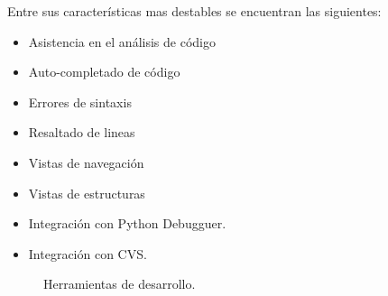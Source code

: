 \documentclass[12pt]{book} %
\begin{document}
		Entre sus características mas destables se encuentran las siguientes:
		\begin{multicols}{2}
		\begin{itemize}
			\item Asistencia en el análisis de código
			\item Auto-completado de código
			\item Errores de sintaxis
			\item Resaltado de lineas
			\item Vistas de navegación
			\item Vistas de estructuras
			\item Integración con Python Debugguer.
			\item Integración con CVS.
		\end{itemize}
		\end{multicols}
		\begin{figure}[hbt]
			\centering
			\caption{Herramientas de desarrollo.}
		\end{figure}	
\end{document}
